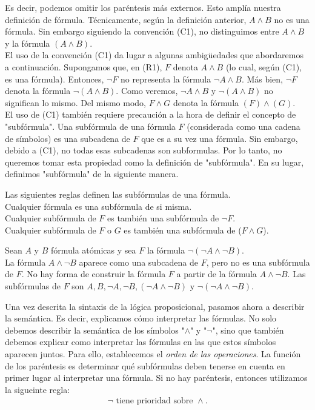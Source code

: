 \message{ !name(main.tex)}\documentclass[12pt,a4paper]{book}
\newcommand{\comillas}[1]{"#1"}
\begin{document}
    Es decir, podemos omitir los paréntesis más externos. Esto amplía nuestra definición de fórmula. Técnicamente, según la definición
    anterior, $A\wedge B$ no es una fórmula. Sin embargo siguiendo la convención (C1), no distinguimos entre $A\wedge B$ y la
    fórmula $(A\wedge B)$.\\
    El uso de la convención (C1) da lugar a algunas ambigüedades que abordaremos a continuación. Supongamos que, en (R1), $F$ denota
    $A\wedge B$ (lo cual, según (C1), es una fórmula). Entonces, $\neg F$ no representa la fórmula $\neg A\wedge B$. Más bien, $\neg F$
    denota la fórmula $\neg(A\wedge B)$. Como veremos, $\neg A\wedge B$ y $\neg(A\wedge B)$ no significan lo mismo. Del mismo modo,
    $F\wedge G$ denota la fórmula $(F)\wedge (G)$.\\
    El uso de (C1) también requiere precaución a la hora de definir el concepto de \comillas{subfórmula}. Una subfórmula de una fórmula
    $F$ (considerada como una cadena de símbolos) es una subcadena de $F$ que es a su vez una fórmula. Sin embargo, debido a (C1), no todas esas
    subcadenas son subformulas. Por lo tanto, no queremos tomar esta propiedad como la definición de \comillas{subfórmula}. En su lugar,
    definimos \comillas{subfórmula} de la siguiente manera.

    \begin{definicion}[Subfórmula]
        Las siguientes reglas definen las subfórmulas de una fórmula.\\
        Cualquier fórmula es una subfórmula de si misma.\\
        Cualquier subfórmula de $F$ es también una subfórmula de $\neg F$.\\
        Cualquier subfórmula de $F$ o $G$ es también una subfórmula de ($F\wedge G$).
    \end{definicion}

    \begin{ejemplo}
        Sean $A$ y $B$ fórmula atómicas y sea $F$ la fórmula $\neg(\neg A\wedge\neg B)$.\\
        La fórmula $A\wedge\neg B$ aparece como una subcadena de $F$, pero no es una subfórmula de $F$. No hay forma de construir
        la fórmula $F$ a partir de la fórmula $A\wedge\neg B$. Las subfórmulas de $F$ son $A,B,\neg A,\neg B,(\neg A\wedge \neg B)$
        y $\neg(\neg A\wedge \neg B)$.
    \end{ejemplo}

    Una vez descrita la sintaxis de la lógica proposicional, pasamos ahora a describir la semántica. Es decir, explicamos cómo interpretar
    las fórmulas. No solo debemos describir la semántica de los símbolos \comillas{$\wedge$} y \comillas{$\neg$}, sino que también debemos explicar
    como interpretar las fórmulas en las que estos símbolos aparecen juntos. Para ello, establecemos el \textit{orden de las operaciones}.
    La función de los paréntesis es determinar qué subfórmulas deben tenerse en cuenta en primer lugar al interpretar una fórmula. Si no hay paréntesis,
    entonces utilizamos la sigueinte regla:
    \begin{gather*}
        \neg\text{ tiene prioridad sobre }\wedge.
    \end{gather*}
\end{document}
